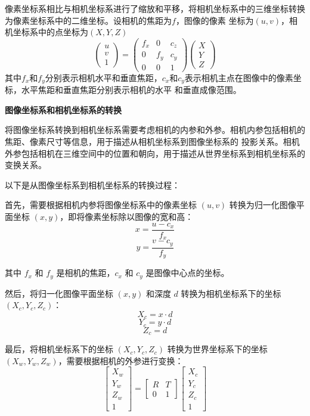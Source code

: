 \documentclass[10pt]{article}
\begin{document}
像素坐标系相比与相机坐标系进行了缩放和平移，将相机坐标系中的三维坐标转换为像素坐标系中的二维坐标。设相机的焦距为$f$，图像的像素
坐标为$(u,v)$，相机坐标系中的点坐标为$(X,Y,Z)$
$$
\left(\begin{array}{l}u\\v\\1\end{array}\right)=
\left(\begin{array}{lll} f_x&0&c_z \\ 0&f_y&c_y \\ 0&0&1\end{array}\right)
\left(\begin{array}{l} X\\Y\\Z \end{array}\right) 
$$
其中$f_x$和$f_y$分别表示相机水平和垂直焦距，$c_x$和$c_y$表示相机主点在图像中的像素坐标，水平焦距和垂直焦距分别表示相机的水平
和垂直成像范围。

\textbf{图像坐标系和相机坐标系的转换}

将图像坐标系转换到相机坐标系需要考虑相机的内参和外参。相机内参包括相机的焦距、像素尺寸等信息，用于描述从相机坐标系到图像坐标系的
投影关系。相机外参包括相机在三维空间中的位置和朝向，用于描述从世界坐标系到相机坐标系的变换关系。

以下是从图像坐标系到相机坐标系的转换过程：

首先，需要根据相机内参将图像坐标系中的像素坐标 $(u, v)$ 转换为归一化图像平面坐标 $(x,y)$，即将像素坐标除以图像的宽和高：
$$x = \frac{u - c_x}{f_x}$$
$$y = \frac{v - c_y}{f_y}$$

其中 $f_x$ 和 $f_y$ 是相机的焦距，$c_x$ 和 $c_y$ 是图像中心点的坐标。

然后，将归一化图像平面坐标 $(x,y)$ 和深度 $d$ 转换为相机坐标系下的坐标 $(X_c,Y_c,Z_c)$：
$$X_c = x \cdot d$$
$$Y_c = y \cdot d$$
$$Z_c = d$$

最后，将相机坐标系下的坐标 $(X_c,Y_c,Z_c)$ 转换为世界坐标系下的坐标 $(X_w,Y_w,Z_w)$，需要根据相机的外参进行变换：
$$\begin{bmatrix} X_w \\ Y_w \\ Z_w \\ 1 \end{bmatrix} = \begin{bmatrix} R & T \\ 0 & 1 \end{bmatrix} \begin{bmatrix} X_c \\ Y_c \\ Z_c \\ 1 \end{bmatrix}$$
\end{document}
